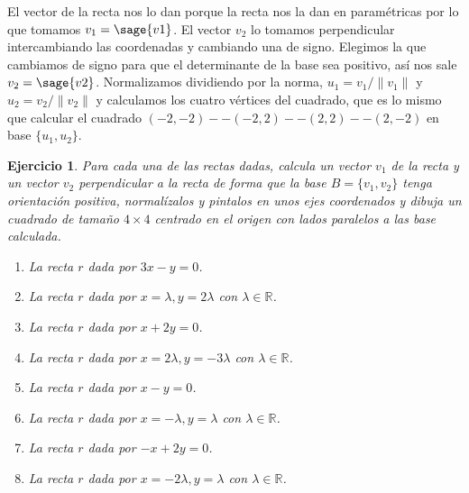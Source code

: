 \documentclass{amsart}
\newtheorem{ejer}{Ejercicio}
\begin{document}
\begin{enumerate}
El vector de la recta nos lo dan porque la recta nos la dan en paramétricas
por lo que tomamos $v_1 = \sage{v1}$. El vector $v_2$ lo tomamos perpendicular intercambiando
las coordenadas y cambiando una de signo. Elegimos la que cambiamos de signo para que el determinante
de la base sea positivo, así nos sale $v_2 = \sage{v2}$. Normalizamos dividiendo por la norma, 
$u_1 = v_1/\|v_1\|$ y $u_2 = v_2/\|v_2\|$ y calculamos
los cuatro vértices del cuadrado, que es lo mismo que calcular el cuadrado $(-2,-2) -- (-2,2) -- (2,2) -- (2,-2)$
en base $\{u_1,u_2\}$.


\begin{sagesub}
\begin{center}
\end{center}
\end{sagesub}
\end{enumerate}


\begin{ejer}
Para cada una de las rectas dadas, calcula un vector $v_1$ de la recta y un vector $v_2$ perpendicular
a la recta de forma que la base $B = \{v_1,v_2\}$ tenga orientación positiva, normalízalos y pintalos 
en unos ejes coordenados y dibuja un cuadrado de tamaño $4\times 4$ centrado en el origen con lados 
paralelos a las base calculada.

\begin{enumerate}
\item La recta $r$ dada por $3x-y = 0$.
\item La recta $r$ dada por $x = \lambda, y = 2\lambda$ con $\lambda \in {\mathbb R}$.
\item La recta $r$ dada por $x+2y = 0$.
\item La recta $r$ dada por $x = 2\lambda, y = -3\lambda$ con $\lambda \in {\mathbb R}$.
\item La recta $r$ dada por $x-y = 0$.
\item La recta $r$ dada por $x = -\lambda, y = \lambda$ con $\lambda \in {\mathbb R}$.
\item La recta $r$ dada por $-x+2y = 0$.
\item La recta $r$ dada por $x = -2\lambda, y = \lambda$ con $\lambda \in {\mathbb R}$.
\end{enumerate}
\end{ejer}
\end{document}
